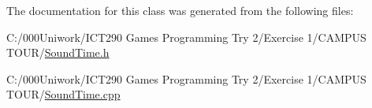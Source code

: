 The documentation for this class was generated from the following files\+:\begin{DoxyCompactItemize}
\item 
C\+:/000\+Uniwork/\+I\+C\+T290 Games Programming Try 2/\+Exercise 1/\+C\+A\+M\+P\+U\+S T\+O\+U\+R/\hyperlink{_sound_time_8h}{Sound\+Time.\+h}\item 
C\+:/000\+Uniwork/\+I\+C\+T290 Games Programming Try 2/\+Exercise 1/\+C\+A\+M\+P\+U\+S T\+O\+U\+R/\hyperlink{_sound_time_8cpp}{Sound\+Time.\+cpp}\end{DoxyCompactItemize}
